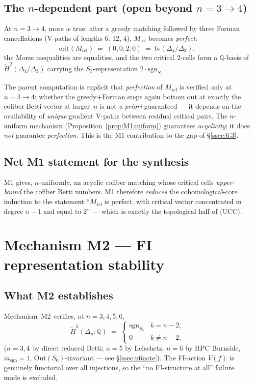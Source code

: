 \documentclass[11pt,reqno]{amsart}
\theoremstyle{plain}
\theoremstyle{definition}
\newcommand{\Hred}{\widetilde H}
\newcommand{\bred}{\widetilde b}
\newcommand{\sgn}{\mathrm{sgn}}
\newcommand{\crit}{\mathrm{crit}}
\newcommand{\Mrel}{M_{\mathrm{rel}}}
\newcommand{\Q}{\mathbb{Q}}
\newcommand{\UCC}{\textup{(UCC)}}
\begin{document}
\subsection{The $n$-dependent part (open beyond $n=3\to4$)}\label{ssec:3.3}
At $n=3\to4$, more is true: after a greedy matching followed by three
Forman cancellations (V-paths of lengths $6$, $12$, $4$), $\Mrel$
becomes \emph{perfect}:
\[
  \crit(\Mrel)\;=\;(0,0,2,0)\;=\;\bred_*(\Delta_4/\Delta_3),
\]
the Morse inequalities are equalities, and the two critical $2$-cells
form a $\Q$-basis of $\Hred^2(\Delta_4/\Delta_3)$ carrying the
$S_3$-representation $2\cdot\sgn_{S_3}$.

The parent computation is explicit that \emph{perfection} of $\Mrel$ is
verified only at $n=3\to4$: whether the greedy$+$Forman steps again
bottom out at exactly the cofiber Betti vector at larger~$n$ is not
\emph{a priori} guaranteed --- it depends on the availability of
\emph{unique} gradient V-paths between residual critical pairs. The
$n$-uniform mechanism (Proposition~\ref{prop:M1uniform}) guarantees
\emph{acyclicity}; it does \emph{not} guarantee \emph{perfection}. This
is the M1 contribution to the gap of \S\ref{ssec:6.3}.

\subsection{Net M1 statement for the synthesis}\label{ssec:3.4}
M1 gives, $n$-uniformly, an acyclic cofiber matching whose critical
cells \emph{upper-bound} the cofiber Betti numbers. M1 therefore
\emph{reduces} the cohomological-core induction to the statement
``$\Mrel$ is perfect, with critical vector concentrated in degree $n-1$
and equal to $2$'' --- which is exactly the topological half of \UCC.

\section{Mechanism M2 --- FI representation stability}\label{sec:M2}

\subsection{What M2 establishes}\label{ssec:4.1}
Mechanism~M2 verifies, at $n=3,4,5,6$,
\[
  \Hred^k(\Delta_n;\Q)\;=\;
  \begin{cases}\sgn_{S_n} & k=n-2,\\[2pt] 0 & k\ne n-2,\end{cases}
\]
($n=3,4$ by direct reduced Betti; $n=5$ by Lefschetz; $n=6$ by HPC
Burnside, $m_{\sgn}=1$, $\mathrm{Out}(S_6)$-invariant --- see
\S\ref{ssec:n6note}). The FI-action $V(f)$ is genuinely functorial over
all injections, so the ``no FI-structure at all'' failure mode is
excluded.
\end{document}
